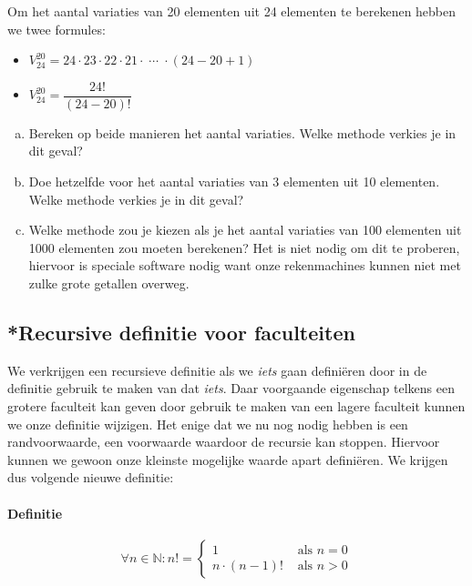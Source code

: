 \documentclass[12pt,a4paper,twoside]{article}
\begin{document}
\begin{oefening}
Om het aantal variaties van 20 elementen uit 24 elementen te berekenen hebben we twee formules:\\
\begin{itemize}
  \itemsep1em
  \item $\displaystyle V^{20}_{24}=24\cdot23\cdot22\cdot21\cdot\;\cdots\;\cdot(24-20+1)$
  \item $\displaystyle V^{20}_{24}=\dfrac{24!}{(24-20)!}$
\end{itemize}
\begin{enumerate}[(a)]
  \item Bereken op beide manieren het aantal variaties. Welke methode verkies je in dit geval?
  \item Doe hetzelfde voor het aantal variaties van 3 elementen uit 10 elementen. Welke methode verkies je in dit geval?
  \item Welke methode zou je kiezen als je het aantal variaties van 100 elementen uit 1000 elementen zou moeten berekenen? Het is niet nodig om dit te proberen, hiervoor is speciale software nodig want onze rekenmachines kunnen niet met zulke grote getallen overweg.
\end{enumerate}
\end{oefening}

\subsection{*Recursive definitie voor faculteiten}

We verkrijgen een recursieve definitie als we {\em iets} gaan definiëren door in de definitie gebruik te maken van dat {\em iets}. Daar voorgaande eigenschap telkens een grotere faculteit kan geven door gebruik te maken van een lagere faculteit kunnen we onze definitie wijzigen. Het enige dat we nu nog nodig hebben is een randvoorwaarde, een voorwaarde waardoor de recursie kan stoppen. Hiervoor kunnen we gewoon onze kleinste mogelijke waarde apart definiëren. We krijgen dus volgende nieuwe definitie:

\paragraph*{Definitie}
\begin{mdframed}
  \[\forall n \in \mathbb{N} : n!=
    \begin{cases}
      1        &\mbox{ als } n=0\\
      n \cdot (n-1)! &\mbox{ als } n>0
    \end{cases}
  \]
\end{mdframed}
\end{document}

